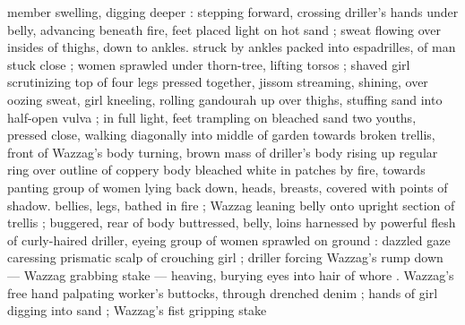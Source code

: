 member swelling, digging deeper : stepping forward, crossing
driller's hands under belly, advancing beneath fire, feet placed light
on hot sand ; sweat flowing over insides of thighs, down to ankles.
struck by ankles packed into espadrilles, of man stuck close ; women
sprawled under thorn-tree, lifting torsos ; shaved girl scrutinizing top
of four legs pressed together, jissom streaming, shining, over oozing
sweat, girl kneeling, rolling gandourah up over thighs, stuffing sand
into half-open vulva ; in full light, feet trampling on bleached sand
two youths, pressed close, walking diagonally into middle of garden
towards broken trellis, front of Wazzag's body turning, brown mass
of driller's body rising up regular ring over outline of coppery body
bleached white in patches by fire, towards panting group of women
lying back down, heads, breasts, covered with points of shadow.
bellies, legs, bathed in fire ; Wazzag leaning belly onto upright
section of trellis ; buggered, rear of body buttressed, belly, loins
harnessed by powerful flesh of curly-haired driller, eyeing group of
women sprawled on ground : dazzled gaze caressing prismatic scalp
of crouching girl ; driller forcing Wazzag's rump down — Wazzag
grabbing stake — heaving, burying eyes into hair of whore .
Wazzag's free hand palpating worker's buttocks, through drenched
denim ; hands of girl digging into sand ; Wazzag's fist gripping stake


